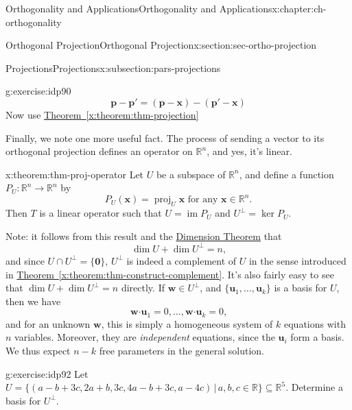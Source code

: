 \documentclass[oneside,10pt,]{book}
\newcommand{\xreffont}{\relax}
\numberwithin{equation}{section}
\newcommand{\R}{\mathbb{R}}
\newcommand{\im}{\operatorname{im}}
\newcommand{\dotp}{\!\boldsymbol{\cdot}\!}
\newcommand{\proj}[2]{\operatorname{proj}_{#1}{#2}}
\newcommand{\uu}{\mathbf{u}}
\newcommand{\ww}{\mathbf{w}}
\newcommand{\xx}{\mathbf{x}}
\begin{document}
\begin{chapterptx}{Orthogonality and Applications}{}{Orthogonality and Applications}{}{}{x:chapter:ch-orthogonality}
\begin{sectionptx}{Orthogonal Projection}{}{Orthogonal Projection}{}{}{x:section:sec-ortho-projection}
\begin{subsectionptx}{Projections}{}{Projections}{}{}{x:subsection:pars-projections}
\begin{inlineexercise}{}{g:exercise:idp90}
\begin{equation*}
\mathbf{p}-\mathbf{p}' = (\mathbf{p}-\xx)-(\mathbf{p}'-\xx)
\end{equation*}
Now use \hyperref[x:theorem:thm-projection]{Theorem~{\xreffont\ref{x:theorem:thm-projection}}}%
\end{inlineexercise}%
Finally, we note one more useful fact. The process of sending a vector to its orthogonal projection defines an operator on \(\R^n\), and yes, it's linear.%
\begin{theorem}{}{}{x:theorem:thm-proj-operator}%
Let \(U\) be a subspace of \(\R^n\), and define a function \(P_U:\R^n\to \R^n\) by%
\begin{equation*}
P_U(\xx) = \proj{U}{\xx} \text{ for any } \xx\in\R^n\text{.}
\end{equation*}
Then \(T\) is a linear operator such that \(U=\im P_U\) and \(U^\bot = \ker P_U\).%
\end{theorem}
Note: it follows from this result and the \hyperref[x:theorem:thm-dimension-lintrans]{Dimension Theorem} that%
\begin{equation*}
\dim U + \dim U^\bot = n\text{,}
\end{equation*}
and since \(U\cap U^\bot = \{\mathbf{0}\}\), \(U^\bot\) is indeed a complement of \(U\) in the sense introduced in \hyperref[x:theorem:thm-construct-complement]{Theorem~{\xreffont\ref{x:theorem:thm-construct-complement}}}. It's also fairly easy to see that \(\dim U + \dim U^\bot = n\) directly. If \(\ww\in U^\bot\), and \(\{\uu_1,\ldots, \uu_k\}\) is a basis for \(U\), then we have%
\begin{equation*}
\ww\dotp \uu_1= 0, \ldots, \ww\dotp \uu_k=0\text{,}
\end{equation*}
and for an unknown \(\ww\), this is simply a homogeneous system of \(k\) equations with \(n\) variables. Moreover, they are \emph{independent} equations, since the \(\uu_i\) form a basis. We thus expect \(n-k\) free parameters in the general solution.%
\begin{inlineexercise}{}{g:exercise:idp92}%
Let \(U = \{(a-b+3c, 2a+b, 3c, 4a-b+3c,a-4c)\,|\, a,b,c\in\R\}\subseteq \R^5\). Determine a basis for \(U^\bot\).%
\end{inlineexercise}%
\end{subsectionptx}
\end{sectionptx}
%
%
\typeout{************************************************}
\typeout{************************************************}
%

\end{chapterptx}
\end{document}
